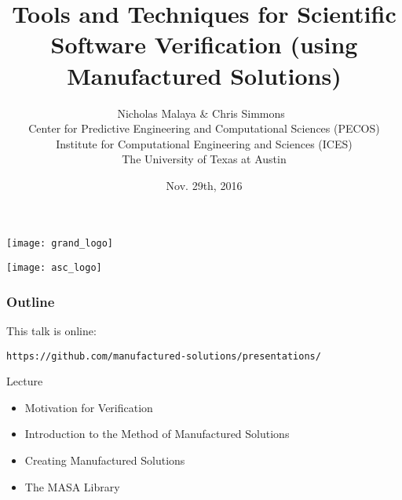 \documentclass[mathserif]{beamer}
\date{Nov. 29th, 2016}
\author[Nicholas Malaya]{Nicholas Malaya \& Chris Simmons
$~$ \\
{\small
Center for Predictive Engineering and Computational Sciences (PECOS) \\
Institute for Computational Engineering and Sciences (ICES) \\
The University of Texas at Austin
}
}
\title[Software Verification]{Tools and Techniques for Scientific Software Verification
(using Manufactured Solutions)}
\begin{document}
\renewcommand{\inserttotalframenumber}{50}

\begin{frame}
  \begin{center}
    \texttt{[image: grand\_logo]}\\
  \end{center}
  \titlepage
  \begin{flushright}
    \texttt{[image: asc\_logo]}\\
  \end{flushright}
\end{frame}

\begin{frame}[fragile]
  \frametitle{Outline}

  This talk is online:
\begin{verbatim}https://github.com/manufactured-solutions/presentations/\end{verbatim}
  
  \begin{block}{Lecture}
    \begin{itemize}
    \item Motivation for Verification
    \item Introduction to the Method of Manufactured Solutions
    \item Creating Manufactured Solutions
    \item The MASA Library
    \end{itemize}
  \end{block}


\end{frame}
\end{document}
